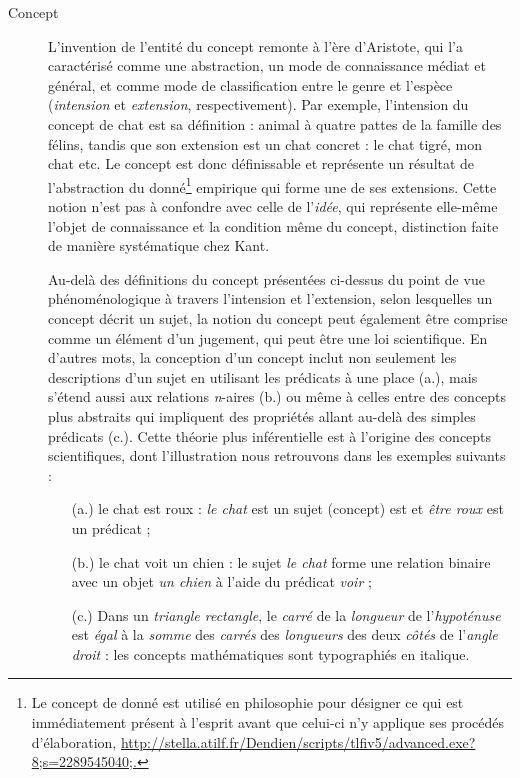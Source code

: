 \begin{description}
\item[Concept] L'invention de l'entité du concept remonte à l'ère d'Aristote, qui l'a caractérisé comme une abstraction, un mode de connaissance médiat et général, et comme mode de classification entre le genre et l'espèce (\textit{intension} et \textit{extension}, respectivement). Par exemple, l'intension du concept de chat est sa définition : \og{}animal à quatre pattes de la famille des félins\fg{}, tandis que son extension est un chat concret : le chat tigré, mon chat etc. Le concept est donc définissable et représente un résultat de l'abstraction du donné\footnote{Le concept de \og{}donné\fg{} est utilisé en philosophie pour désigner \og{}ce qui est immédiatement présent à l'esprit avant que celui-ci n'y applique ses procédés d'élaboration\fg{}, \url{http://stella.atilf.fr/Dendien/scripts/tlfiv5/advanced.exe?8;s=2289545040;.}} empirique qui forme une de ses extensions. Cette notion n'est pas à confondre avec celle de l'\textit{idée}, qui représente elle-même l'objet de connaissance et la condition même du concept, distinction faite de manière systématique chez Kant.

Au-delà des définitions du concept présentées ci-dessus du point de vue phénoménologique à travers l'intension et l'extension, selon lesquelles un concept décrit un sujet, la notion du concept peut également être comprise comme un élément d'un jugement, qui peut être une loi scientifique. En d'autres mots, la conception d'un concept inclut non seulement les descriptions d'un sujet en utilisant les prédicats à une place (a.), mais s'étend aussi aux relations \textit{n}-aires (b.) ou même à celles entre des concepts plus abstraits qui impliquent des propriétés allant au-delà des simples prédicats (c.). Cette théorie plus \og{}inférentielle\fg{} est à l'origine des concepts scientifiques, dont l'illustration nous retrouvons dans les exemples suivants :
\begin{itemize}
\item[\quad (a.)] \og{}le chat est roux\fg{} : \textit{le chat} est un sujet (concept) est et \textit{être roux} est un prédicat ;
\item[\quad (b.)] \og{}le chat voit un chien\fg{} : le sujet \textit{le chat} forme une relation binaire avec un objet \textit{un chien} à l'aide du prédicat \textit{voir} ;
\item[\quad (c.)] \og{}Dans un \textit{triangle rectangle}, le \textit{carré} de la \textit{longueur} de l'\textit{hypoténuse} est \textit{égal} à la \textit{somme} des \textit{carrés} des \textit{longueurs} des deux \textit{côtés} de l'\textit{angle droit}\fg{} : les concepts mathématiques sont typographiés en italique.
\end{itemize}


\end{description}
